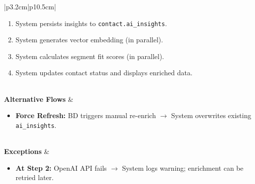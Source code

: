 \documentclass[a4paper]{article}
\begin{document}
\begin{table}[H]
\begin{tabular}{|p{3.2cm}|p{10.5cm}|}
\begin{minipage}[t]{\linewidth}
\begin{enumerate}[nosep,leftmargin=*]
  \item System persists insights to \texttt{contact.ai\_insights}.
  \item System generates vector embedding (in parallel).
  \item System calculates segment fit scores (in parallel).
  \item System updates contact status and displays enriched data.
\end{enumerate}
\end{minipage} \\
\hline
\textbf{Alternative Flows} &
\begin{minipage}[t]{\linewidth}
\begin{itemize}[nosep,leftmargin=*]
  \item \textbf{Force Refresh:} BD triggers manual re-enrich 
  $\rightarrow$ System overwrites existing \texttt{ai\_insights}.
\end{itemize}
\end{minipage} \\
\hline
\textbf{Exceptions} &
\begin{minipage}[t]{\linewidth}
\begin{itemize}[nosep,leftmargin=*]
  \item \textbf{At Step 2:} OpenAI API fails $\rightarrow$ System 
  logs warning; enrichment can be retried later.
\end{itemize}
\end{minipage} \\
\hline
\end{tabular}
\end{table}
\end{document}
